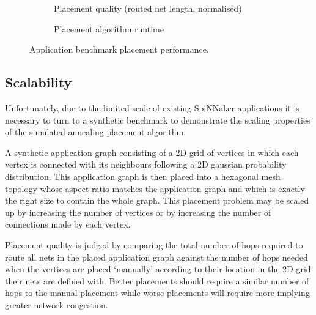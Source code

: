 			\begin{figure}
				\center
				\begin{subfigure}{\linewidth}
					\center
					
					\caption{Placement quality (routed net length, normalised)}
					\label{fig:application-benchmarks-quality}
				\end{subfigure}
				
				\begin{subfigure}{\linewidth}
					\center
					
					\caption{Placement algorithm runtime}
					\label{fig:application-benchmarks-runtime}
				\end{subfigure}
				
				\caption{Application benchmark placement performance.}
				\label{fig:application-benchmarks}
			\end{figure}
			
		\subsection{Scalability}
			
			Unfortunately, due to the limited scale of existing SpiNNaker
			applications it is necessary to turn to a synthetic benchmark to
			demonstrate the scaling properties of the simulated annealing placement
			algorithm.
			
			A synthetic application graph consisting of a 2D grid of vertices in
			which each vertex is connected with its neighbours following a 2D
			gaussian probability distribution. This application graph is then placed
			into a hexagonal mesh topology whose aspect ratio matches the application
			graph and which is exactly the right size to contain the whole graph.
			This placement problem may be scaled up by increasing the number of
			vertices or by increasing the number of connections made by each vertex.
			
			Placement quality is judged by comparing the total number of hops
			required to route all nets in the placed application graph against the
			number of hops needed when the vertices are placed `manually' according
			to their location in the 2D grid their nets are defined with. Better
			placements should require a similar number of hops to the manual
			placement while worse placements will require more implying greater
			network congestion.
			
